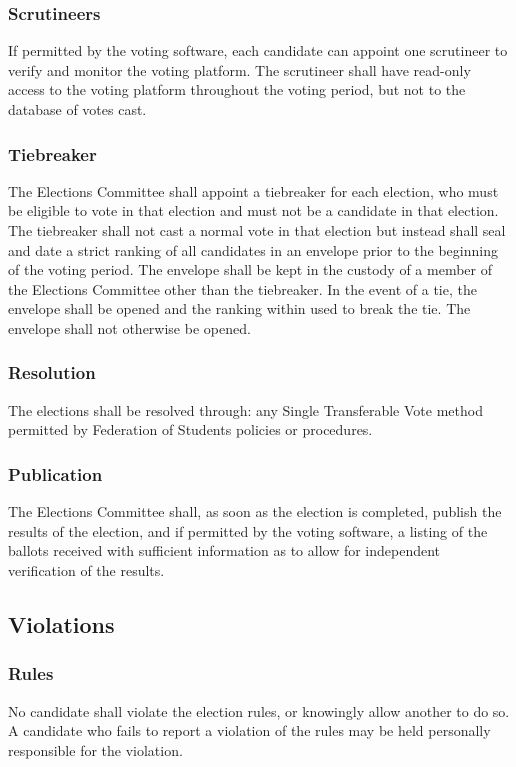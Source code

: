 \subsubsection{Scrutineers}
If permitted by the voting software, each candidate can appoint one scrutineer to verify and monitor the voting platform.
The scrutineer shall have read-only access to the voting platform throughout the voting period, but not to the database of votes cast.

\subsubsection{Tiebreaker}
The Elections Committee shall appoint a tiebreaker for each election, who must be eligible to vote in that election and must not be a candidate in that election.
The tiebreaker shall not cast a normal vote in that election but instead shall seal and date a strict ranking of all candidates in an envelope prior to the beginning of the voting period.
The envelope shall be kept in the custody of a member of the Elections Committee other than the tiebreaker.
In the event of a tie, the envelope shall be opened and the ranking within used to break the tie.
The envelope shall not otherwise be opened.

\subsubsection{Resolution}
The elections shall be resolved through: any Single Transferable Vote method permitted by Federation of Students policies or procedures.

\subsubsection{Publication}
The Elections Committee shall, as soon as the election is completed, publish the results of the election, and if permitted by the voting software, a listing of the ballots received with sufficient information as to allow for independent verification of the results.

\subsection{Violations}
\subsubsection{Rules}
No candidate shall violate the election rules, or knowingly allow another to do so.
A candidate who fails to report a violation of the rules may be held personally responsible for the violation.

